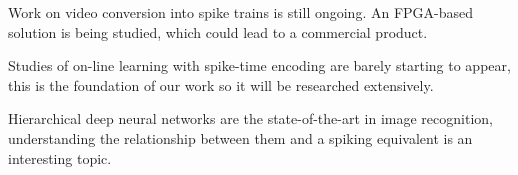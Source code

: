 Work on video conversion into spike trains is still ongoing. An FPGA-based solution is being studied, which could lead to a commercial product.

Studies of on-line learning with spike-time encoding are barely starting to appear, this is the foundation of our work so it will be researched extensively.

Hierarchical deep neural networks are the state-of-the-art in image recognition, understanding the relationship between them and a spiking equivalent is an interesting topic.

